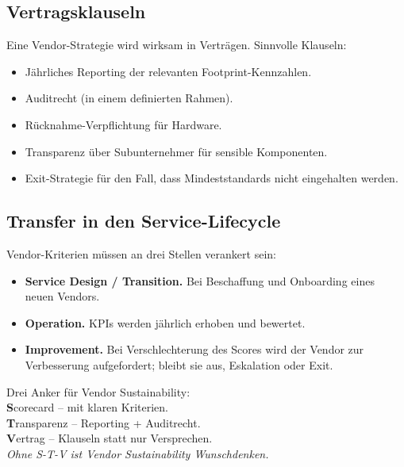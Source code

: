 \documentclass[11pt,a4paper,oneside]{article}
\newcommand{\caveatfontfallback}{\itshape}
\newcommand\caveatfont{\caveatfontfallback}%
\newcommand{\akzent}[1]{{\caveatfont\color{lpAmber}#1}}
\begin{document}
\subsection{Vertragsklauseln}

Eine Vendor-Strategie wird wirksam in Verträgen. Sinnvolle Klauseln:

\begin{itemize}
  \item Jährliches Reporting der relevanten Footprint-Kennzahlen.
  \item Auditrecht (in einem definierten Rahmen).
  \item Rücknahme-Verpflichtung für Hardware.
  \item Transparenz über Subunternehmer für sensible Komponenten.
  \item Exit-Strategie für den Fall, dass Mindeststandards nicht eingehalten werden.
\end{itemize}

\subsection{Transfer in den Service-Lifecycle}

Vendor-Kriterien müssen an drei Stellen verankert sein:

\begin{itemize}
  \item \textbf{Service Design / Transition.} Bei Beschaffung und Onboarding eines neuen Vendors.
  \item \textbf{Operation.} KPIs werden jährlich erhoben und bewertet.
  \item \textbf{Improvement.} Bei Verschlechterung des Scores wird der Vendor zur Verbesserung aufgefordert; bleibt sie aus, Eskalation oder Exit.
\end{itemize}

\begin{eselsbox}[Eselsbrücke: \akzent{S-T-V}]
Drei Anker für Vendor Sustainability:\\[2pt]
\textbf{S}corecard -- mit klaren Kriterien.\\
\textbf{T}ransparenz -- Reporting + Auditrecht.\\
\textbf{V}ertrag -- Klauseln statt nur Versprechen.\\[2pt]
\emph{Ohne S-T-V ist Vendor Sustainability Wunschdenken.}
\end{eselsbox}

\end{document}
